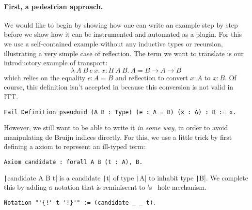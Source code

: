 \paragraph{First, a pedestrian approach.}
%
We would like to begin by showing how one can write an example step by step
before we show how it can be instrumented and automated as a plugin.
For this we use a self-contained example without any inductive
types or recursion, illustrating a very simple case of reflection.
The term we want to translate is our introductory example of transport:
\[
  \lambda\ A\ B\ e\ x.\ x : \Pi\ A\ B.\ A = B \to
  A \to B
\]
which relies on the equality $e : A = B$ and reflection to convert $x
: A$ to $x : B$.
%
Of course, this definition isn't accepted in \Coq because this
conversion is not valid in ITT.
%
\begin{verbatim}
Fail Definition pseudoid (A B : Type) (e : A = B) (x : A) : B := x.
\end{verbatim}
%
However, we still want to be able to write it \emph{in some way}, in order to
avoid manipulating de Bruijn indices directly.
For this, we use a little trick by first defining a \Coq axiom to represent
an ill-typed term:
%
\begin{verbatim}
Axiom candidate : forall A B (t : A), B.
\end{verbatim}
%
\texttt|candidate A B t| is a candidate \texttt|t| of type
\texttt|A| to inhabit type \texttt|B|.
We complete this by adding a notation that is reminiscent to
\Agda's~ hole mechanism.
%
\begin{verbatim}
Notation "'{!' t '!}'" := (candidate _ _ t).
\end{verbatim}

